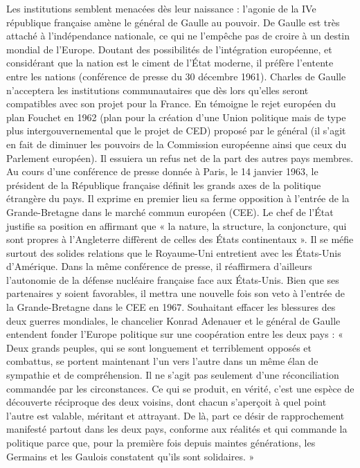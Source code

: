 \documentclass{report}%
\begin{document}
Les institutions semblent menacées dès leur naissance : l'agonie de la IVe république française amène le général de Gaulle au pouvoir. De Gaulle est très attaché à l'indépendance nationale, ce qui ne l'empêche pas de croire à un destin mondial de l'Europe. Doutant des possibilités de l'intégration européenne, et considérant que la nation est le ciment de l'État moderne, il préfère l'entente entre les nations (conférence de presse du 30 décembre 1961). Charles de Gaulle n'acceptera les institutions communautaires que dès lors qu'elles seront compatibles avec son projet pour la France. En témoigne le rejet européen du plan Fouchet en 1962 (plan pour la création d'une Union politique mais de type plus intergouvernemental que le projet de CED) proposé par le général (il s'agit en fait de diminuer les pouvoirs de la Commission européenne ainsi que ceux du Parlement européen). Il essuiera un refus net de la part des autres pays membres. Au cours d'une conférence de presse donnée à Paris, le 14 janvier 1963, le président de la République française définit les grands axes de la politique étrangère du pays. Il exprime en premier lieu sa ferme opposition à l'entrée de la Grande-Bretagne dans le marché commun européen (CEE). Le chef de l'État justifie sa position en affirmant que « la nature, la structure, la conjoncture, qui sont propres à l'Angleterre diffèrent de celles des États continentaux ». Il se méfie surtout des solides relations que le Royaume-Uni entretient avec les États-Unis d'Amérique. Dans la même conférence de presse, il réaffirmera d’ailleurs l'autonomie de la défense nucléaire française face aux États-Unis. Bien que ses partenaires y soient favorables, il mettra une nouvelle fois son veto à l’entrée de la Grande-Bretagne dans le CEE en 1967.
Souhaitant effacer les blessures des deux guerres mondiales, le chancelier Konrad Adenauer et le général de Gaulle entendent fonder l'Europe politique sur une coopération entre les deux pays :
« Deux grands peuples, qui se sont longuement et terriblement opposés et combattus, se portent maintenant l’un vers l’autre dans un même élan de sympathie et de compréhension. Il ne s’agit pas seulement d’une réconciliation commandée par les circonstances. Ce qui se produit, en vérité, c’est une espèce de découverte réciproque des deux voisins, dont chacun s’aperçoit à quel point l’autre est valable, méritant et attrayant.
De là, part ce désir de rapprochement manifesté partout dans les deux pays, conforme aux réalités et qui commande la politique parce que, pour la première fois depuis maintes générations, les Germains et les Gaulois constatent qu’ils sont solidaires. »
\end{document}
